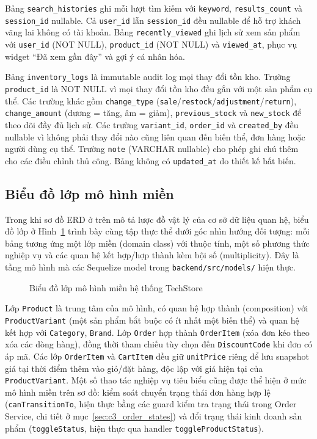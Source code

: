 Bảng \texttt{search\_histories} ghi mỗi lượt tìm kiếm với \texttt{keyword}, \texttt{results\_count} và \texttt{session\_id} nullable. Cả \texttt{user\_id} lẫn \texttt{session\_id} đều nullable để hỗ trợ khách vãng lai không có tài khoản. Bảng \texttt{recently\_viewed} ghi lịch sử xem sản phẩm với \texttt{user\_id} (NOT NULL), \texttt{product\_id} (NOT NULL) và \texttt{viewed\_at}, phục vụ widget ``Đã xem gần đây'' và gợi ý cá nhân hóa.

Bảng \texttt{inventory\_logs} là immutable audit log mọi thay đổi tồn kho. Trường \texttt{product\_id} là NOT NULL vì mọi thay đổi tồn kho đều gắn với một sản phẩm cụ thể. Các trường khác gồm \texttt{change\_type} (\texttt{sale}\slash\texttt{restock}\slash\texttt{adjustment}\slash\texttt{return}), \texttt{change\_amount} (dương = tăng, âm = giảm), \texttt{previous\_stock} và \texttt{new\_stock} để theo dõi đầy đủ lịch sử. Các trường \texttt{variant\_id}, \texttt{order\_id} và \texttt{created\_by} đều nullable vì không phải thay đổi nào cũng liên quan đến biến thể, đơn hàng hoặc người dùng cụ thể. Trường \texttt{note} (VARCHAR nullable) cho phép ghi chú thêm cho các điều chỉnh thủ công. Bảng không có \texttt{updated\_at} do thiết kế bất biến.

\subsection{Biểu đồ lớp mô hình miền}
\label{sec:c3_class_diagram}

Trong khi sơ đồ ERD ở trên mô tả lược đồ vật lý của cơ sở dữ liệu quan hệ, biểu đồ lớp ở Hình~\ref{fig:class_domain} trình bày cùng tập thực thể dưới góc nhìn hướng đối tượng: mỗi bảng tương ứng một lớp miền (domain class) với thuộc tính, một số phương thức nghiệp vụ và các quan hệ kết hợp\slash hợp thành kèm bội số (multiplicity). Đây là tầng mô hình mà các Sequelize model trong \texttt{backend/src/models/} hiện thực.

\begin{figure}[H]
  \centering
  \caption{Biểu đồ lớp mô hình miền hệ thống TechStore}
  \label{fig:class_domain}
\end{figure}

Lớp \texttt{Product} là trung tâm của mô hình, có quan hệ hợp thành (composition) với \texttt{ProductVariant} (một sản phẩm bắt buộc có ít nhất một biến thể) và quan hệ kết hợp với \texttt{Category}, \texttt{Brand}. Lớp \texttt{Order} hợp thành \texttt{OrderItem} (xóa đơn kéo theo xóa các dòng hàng), đồng thời tham chiếu tùy chọn đến \texttt{DiscountCode} khi đơn có áp mã. Các lớp \texttt{OrderItem} và \texttt{CartItem} đều giữ \texttt{unitPrice} riêng để lưu snapshot giá tại thời điểm thêm vào giỏ\slash đặt hàng, độc lập với giá hiện tại của \texttt{ProductVariant}. Một số thao tác nghiệp vụ tiêu biểu cũng được thể hiện ở mức mô hình miền trên sơ đồ: kiểm soát chuyển trạng thái đơn hàng hợp lệ (\texttt{canTransitionTo}, hiện thực bằng các guard kiểm tra trạng thái trong Order Service, chi tiết ở mục~\ref{sec:c3_order_states}) và đổi trạng thái kinh doanh sản phẩm (\texttt{toggleStatus}, hiện thực qua handler \texttt{toggleProductStatus}).

